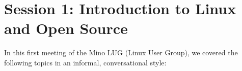 \newcommand{\sessionnumber}{1}
\newcommand{\sessiontitle}{Introduction to Linux and Open Source}
\newcommand{\sessiondate}{\today}
\newcommand{\sessionabstract}{This document serves as the first installment in the Linux User Group series, providing an introduction to Linux, open-source concepts, and our group’s mission.}




	
    \maketitle
    
    \makeabstract
    
    \vfill
    
    \makelicense
    
    \newpage
    
    \tableofcontents
    \newpage
    
    
    \section{Session 1: Introduction to Linux and Open Source}\label{sec:session1}
    
    In this first meeting of the Mino LUG (Linux User Group), we covered the following topics in an informal, conversational style:
    
